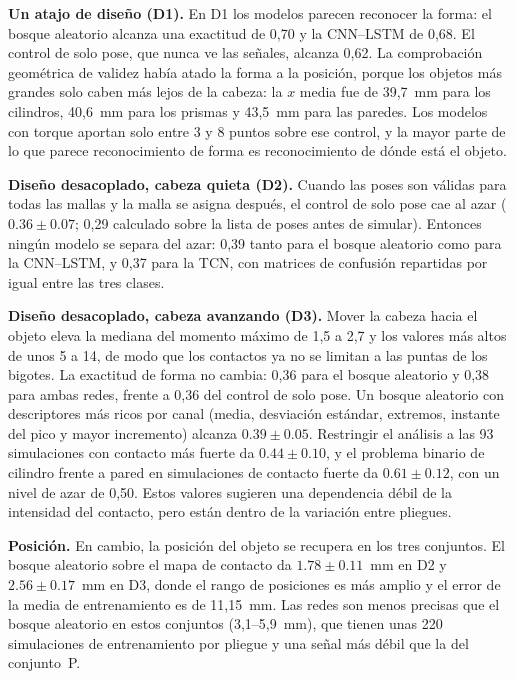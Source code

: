 \documentclass[conference]{IEEEtran}
\newcommand{\pmsd}[2]{$#1 \pm #2$}
\begin{document}
\textbf{Un atajo de diseño (D1).} En D1 los modelos parecen reconocer la forma: el bosque aleatorio alcanza una exactitud de 0,70 y la CNN--LSTM de 0,68. El control de solo pose, que nunca ve las señales, alcanza 0,62. La comprobación geométrica de validez había atado la forma a la posición, porque los objetos más grandes solo caben más lejos de la cabeza: la $x$ media fue de 39,7~mm para los cilindros, 40,6~mm para los prismas y 43,5~mm para las paredes. Los modelos con torque aportan solo entre 3 y 8 puntos sobre ese control, y la mayor parte de lo que parece reconocimiento de forma es reconocimiento de dónde está el objeto.

\textbf{Diseño desacoplado, cabeza quieta (D2).} Cuando las poses son válidas para todas las mallas y la malla se asigna después, el control de solo pose cae al azar (\pmsd{0.36}{0.07}; 0,29 calculado sobre la lista de poses antes de simular). Entonces ningún modelo se separa del azar: 0,39 tanto para el bosque aleatorio como para la CNN--LSTM, y 0,37 para la TCN, con matrices de confusión repartidas por igual entre las tres clases.

\textbf{Diseño desacoplado, cabeza avanzando (D3).} Mover la cabeza hacia el objeto eleva la mediana del momento máximo de 1,5 a 2,7 y los valores más altos de unos 5 a 14, de modo que los contactos ya no se limitan a las puntas de los bigotes. La exactitud de forma no cambia: 0,36 para el bosque aleatorio y 0,38 para ambas redes, frente a 0,36 del control de solo pose. Un bosque aleatorio con descriptores más ricos por canal (media, desviación estándar, extremos, instante del pico y mayor incremento) alcanza \pmsd{0.39}{0.05}. Restringir el análisis a las 93 simulaciones con contacto más fuerte da \pmsd{0.44}{0.10}, y el problema binario de cilindro frente a pared en simulaciones de contacto fuerte da \pmsd{0.61}{0.12}, con un nivel de azar de 0,50. Estos valores sugieren una dependencia débil de la intensidad del contacto, pero están dentro de la variación entre pliegues.

\textbf{Posición.} En cambio, la posición del objeto se recupera en los tres conjuntos. El bosque aleatorio sobre el mapa de contacto da \pmsd{1.78}{0.11}~mm en D2 y \pmsd{2.56}{0.17}~mm en D3, donde el rango de posiciones es más amplio y el error de la media de entrenamiento es de 11,15~mm. Las redes son menos precisas que el bosque aleatorio en estos conjuntos (3,1--5,9~mm), que tienen unas 220 simulaciones de entrenamiento por pliegue y una señal más débil que la del conjunto~P.
\end{document}
